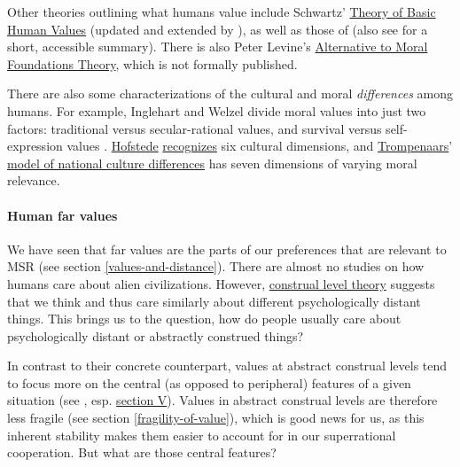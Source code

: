 Other theories outlining what humans value include Schwartz'
\href{https://en.wikipedia.org/wiki/Theory_of_Basic_Human_Values}{Theory
of Basic Human Values} (updated and extended by
\citet{Schwartz2012-qi}), as well as those of
\citet{Shweder1997-ge} (also see
\citet{Pinker2011-el} for a short, accessible summary).
There is also Peter Levine's
\href{http://peterlevine.ws/?p=16998}{Alternative to Moral
Foundations Theory}, which is not formally published.

There are also some characterizations of the cultural and moral
\emph{differences} among humans. For example,
Inglehart and Welzel divide moral values into just
two factors: traditional versus secular-rational values, and survival
versus self-expression values \citeyear{Inglehart2010-qr}.
\href{https://en.wikipedia.org/wiki/Geert_Hofstede}{Hofstede}
\href{https://en.wikipedia.org/wiki/Hofstede\%27s_cultural_dimensions_theory}{recognizes}
six cultural dimensions, and
\href{https://en.wikipedia.org/wiki/Fons_Trompenaars}{Trompenaars}'
\href{https://en.wikipedia.org/wiki/Trompenaars\%27_model_of_national_culture_differences}{model
of national culture differences} has seven dimensions of varying moral
relevance.

\hypertarget{human-far-values}{\paragraph{Human far
values}\label{human-far-values}}

We have seen that far values are the parts of our preferences that are
relevant to MSR (see section
\ref{values-and-distance}). There are almost no studies on how humans care about
alien civilizations. However,
\href{https://en.wikipedia.org/wiki/Construal_level_theory}{construal
level theory} suggests that we think and thus care similarly about
different psychologically distant things. This brings us to the
question, how do people usually care about psychologically distant or
abstractly construed things?

In contrast to their concrete counterpart, values at abstract construal
levels tend to focus more on the central (as opposed to peripheral)
features of a given situation (see \citet{Trope2010-vo},
esp.
\href{http://www.psych.nyu.edu/trope/Trope_Liberman_2010.pdf\#page=12}{section
V}). Values in abstract construal levels are therefore less fragile
(see section \ref{fragility-of-value}), which is good news for us, as this inherent stability makes
them easier to account for in our superrational cooperation. But what
are those central features?

